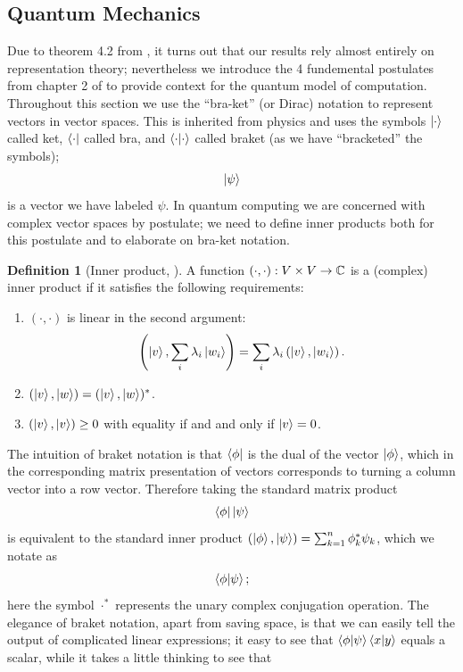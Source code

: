 \documentclass[12pt,twoside]{reedthesis}
\theoremstyle{plain}   %
\theoremstyle{definition}
\newtheorem{defn}{Definition}[section]
\theoremstyle{remark}
\numberwithin{equation}{section}
\begin{document}
  \subsection{Quantum Mechanics}
  Due to theorem 4.2 from \cite{copeland}, it turns out that our results rely almost entirely on representation theory;
  nevertheless we introduce the 4 fundemental postulates from chapter 2 of \cite{nielsen2010} to provide context for the quantum model of computation.
  Throughout this section we use the ``bra-ket'' (or Dirac) notation to represent vectors in vector spaces. This is inherited from physics and uses the symbols
  $\ket{\cdot}$ called ket, $\bra{\cdot}$ called bra, and $\braket{\cdot | \cdot}$ called braket (as we have ``bracketed'' the symbols); 
  \[ \ket{\psi} \]
  is a vector we have labeled $\psi$. In quantum computing we are concerned with complex vector spaces by postulate; we need to define inner products both for this postulate and to elaborate on bra-ket notation.
  \begin{defn}[{Inner product, \cite[2.1.4]{nielsen2010}}]
    A function $(\cdot, \cdot): V \times V \to \mathbb{C}$ is a (complex) inner product if it satisfies the following requirements:
    \begin{enumerate}
    \item $(\cdot, \cdot)$ is linear in the second argument:
      \[ \left( \ket{v}, \sum_i \lambda_i \ket{w_i} \right) = \sum_i \lambda_i \left( \ket{v}, \ket{w_i} \right).\]
    \item $(\ket{v}, \ket{w}) = (\ket{v}, \ket{w})^*$.
    \item $(\ket{v}, \ket{v}) \geq 0$ with equality if and and only if $\ket{v} = 0$.
    \end{enumerate}
  \end{defn}
  The intuition of braket notation is that $\bra{\phi}$ is the dual of the vector $\ket{\phi}$, which in the corresponding matrix presentation
  of vectors corresponds to turning a column vector into a row vector. Therefore taking the standard matrix product
  \[\bra{\phi} \ket{\psi}\]
  is equivalent to the standard inner product $(\ket{\phi}, \ket{\psi}) = \sum_{k=1}^n \phi_k^* \psi_k$, which we notate as
  \[\braket{\phi | \psi};\]
  here the symbol $\cdot^*$ represents the unary complex conjugation operation.
  The elegance of braket notation, apart from saving space, is that we can easily tell the output of complicated linear expressions;
  it easy to see that $\braket{\phi | \psi} \braket{x | y}$ equals a scalar, while it takes a little thinking to see that
\end{document}
